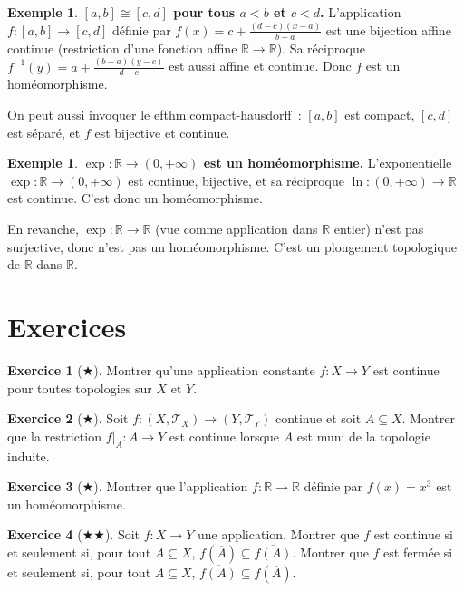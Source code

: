 \documentclass[12pt,a4paper,openany]{book}
\theoremstyle{definition}
\theoremstyle{cours}
\theoremstyle{coursnormal}
\newtheorem{exemple}[theoreme]{Exemple}
\newtheorem{exercice}{Exercice}[chapter]
\newcommand{\R}{\mathbb{R}}
\newcommand{\T}{\mathcal{T}}
\begin{document}
\begin{exemple}\label{ex:homeo-intervalle}
  \textbf{$[a,b]\cong[c,d]$ pour tous $a<b$ et $c<d$.}
  L'application $f\colon[a,b]\to[c,d]$ définie par
  $f(x) = c + \frac{(d-c)(x-a)}{b-a}$ est une bijection affine continue
  (restriction d'une fonction affine $\R\to\R$). Sa réciproque
  $f^{-1}(y) = a + \frac{(b-a)(y-c)}{d-c}$ est aussi affine et continue.
  Donc $f$ est un homéomorphisme.

  On peut aussi invoquer le 
ef{thm:compact-hausdorff}~: $[a,b]$ est
  compact, $[c,d]$ est séparé, et $f$ est bijective et continue.
\end{exemple}

\begin{exemple}\label{ex:exponentielle-non-homeo}
  \textbf{$\exp\colon\R\to(0,+\infty)$ est un homéomorphisme.}
  L'exponentielle $\exp\colon\R\to(0,+\infty)$ est continue, bijective, et sa
  réciproque $\ln\colon(0,+\infty)\to\R$ est continue. C'est donc un
  homéomorphisme.

  En revanche, $\exp\colon\R\to\R$ (vue comme application dans $\R$ entier)
  n'est pas surjective, donc n'est pas un homéomorphisme. C'est un
  plongement topologique de $\R$ dans $\R$.
\end{exemple}

\section{Exercices}\label{sec:exercices-ch4}

\begin{exercice}[$\bigstar$]
  Montrer qu'une application constante $f\colon X\to Y$ est continue pour
  toutes topologies sur $X$ et $Y$.
\end{exercice}

\begin{exercice}[$\bigstar$]
  Soit $f\colon(X,\T_X)\to(Y,\T_Y)$ continue et soit $A\subseteq X$. Montrer
  que la restriction $f|_A\colon A\to Y$ est continue lorsque $A$ est muni de
  la topologie induite.
\end{exercice}

\begin{exercice}[$\bigstar$]
  Montrer que l'application $f\colon\R\to\R$ définie par $f(x)=x^3$ est un
  homéomorphisme.
\end{exercice}

\begin{exercice}[$\bigstar\bigstar$]
  Soit $f\colon X\to Y$ une application. Montrer que $f$ est continue si et
  seulement si, pour tout $A\subseteq X$,
  $f(\overline{A})\subseteq\overline{f(A)}$. Montrer que $f$ est fermée si et
  seulement si, pour tout $A\subseteq X$,
  $\overline{f(A)}\subseteq f(\overline{A})$.
\end{exercice}
\end{document}
